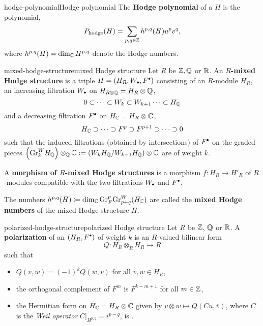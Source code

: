 \begin{topic}{hodge-polynomial}{Hodge polynomial}
    The \textbf{Hodge polynomial} of a  $H$ is the polynomial,
    \[ P_\textup{hodge}(H) = \sum_{p, q \in \mathbb{Z}} h^{p, q}(H) u^p v^q , \]
    where $h^{p, q}(H) = \dim_{\mathbb{C}} H^{p, q}$ denote the Hodge numbers.
\end{topic}

\begin{topic}{mixed-hodge-structure}{mixed Hodge structure}
    Let $R$ be $\mathbb{Z}, \mathbb{Q}$ or $\mathbb{R}$. An \textbf{$R$-mixed Hodge structure} is a triple $H = (H_R, W_\bdot, F^\bdot)$ consisting of an $R$-module $H_R$, an increasing filtration $W_\bdot$ on $H_{R \otimes \mathbb{Q}} = H_R \otimes \mathbb{Q}$,
    \[ 0 \subset \cdots \subset W_k \subset W_{k + 1} \cdots \subset H_{\mathbb{Q}} \]
    and a decreasing filtration $F^\bdot$ on $H_{\mathbb{C}} = H_R \otimes \mathbb{C}$,
    \[ H_{\mathbb{C}} \supset \cdots \supset F^p \supset F^{p + 1} \supset \cdots \supset 0 \]
    such that the induced filtrations (obtained by intersections) of $F^\bdot$ on the graded pieces $\left(\textup{Gr}^W_k H_{\mathbb{Q}}\right) \otimes_{\mathbb{Q}} \mathbb{C} := \left(W_k H_{\mathbb{Q}} / W_{k - 1} H_{\mathbb{Q}}\right) \otimes \mathbb{C}$ are  of weight $k$.
    
    A \textbf{morphism of $R$-mixed Hodge structures} is a morphism $f \colon H_R \to H'_R$ of $R$-modules compatible with the two filtrations $W_\bdot$ and $F^\bdot$.
    
    The numbers $h^{p, q}(H) \coloneqq \dim_{\mathbb{C}} \textup{Gr}_F^p \textup{Gr}^W_{p + q}(H_{\mathbb{C}})$ are called the \textbf{mixed Hodge numbers} of the mixed Hodge structure $H$.
\end{topic}

\begin{topic}{polarized-hodge-structure}{polarized Hodge structure}
    Let $R$ be $\mathbb{Z}$, $\mathbb{Q}$ or $\mathbb{R}$. A \textbf{polarization} of an  $(H_R, F^\bdot)$ of weight $k$ is an $R$-valued bilinear form
    \[ Q \colon H_R \otimes_R H_R \to R \]
    such that
    \begin{itemize}
        \item $Q(v, w) = (-1)^k Q(w, v)$ for all $v, w \in H_R$,
        \item the orthogonal complement of $F^m$ is $F^{k - m + 1}$ for all $m \in \mathbb{Z}$,
        \item the Hermitian form on $H_{\mathbb{C}} = H_R \otimes \mathbb{C}$ given by $v \otimes w \mapsto Q(C u, \overline{v})$, where $C$ is the \textit{Weil operator} $C|_{H^{p, q}} = i^{p - q}$, is .
    \end{itemize}
\end{topic}
